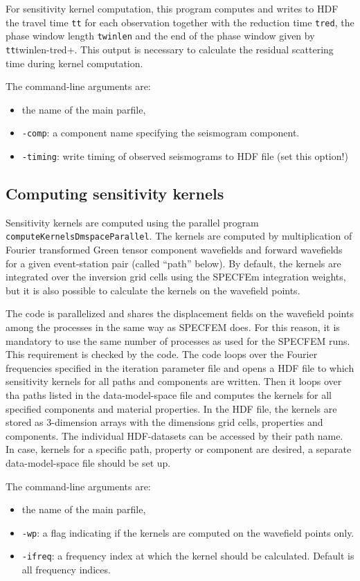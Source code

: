 For sensitivity kernel computation, this program computes and writes to HDF the travel time \verb+tt+ for each observation together with the reduction time \verb+tred+, the phase window length \verb+twinlen+ and the end of the phase window given by \verb+tt+twinlen-tred+. This output is necessary to calculate the residual scattering time during kernel computation.

 The command-line arguments are:
 \begin{itemize}
	\setlength{\itemsep}{-0.1cm}
   \item the name of the main parfile,
   \item \verb+-comp+: a component name specifying the seismogram component.
   \item \verb+-timing+: write timing of observed seismograms to HDF file (set this option!)
 \end{itemize}
%
\subsection{Computing sensitivity kernels}
%
 Sensitivity kernels are computed using the parallel program \verb+computeKernelsDmspaceParallel+. The kernels are computed by multiplication of Fourier transformed Green tensor component wavefields and forward wavefields for a given event-station pair (called “path” below). By default, the kernels are integrated over the inversion grid cells using the SPECFEm integration weights, but it is also possible to calculate the kernels on the wavefield points.

 The code is parallelized and shares the displacement fields on the wavefield points among the processes in the same way as SPECFEM does. For this reason, it is mandatory to use the same number of processes as used for the SPECFEM runs. This requirement is checked by the code. The code loops over the Fourier frequencies specified in the iteration parameter file and opens a HDF file to which sensitivity kernels for all paths and components are written. Then it loops over tha paths listed in the data-model-space file and computes the kernels for all specified components and material properties. In the HDF file, the kernels are stored as 3-dimension arrays with the dimensions grid cells, properties and components. The individual HDF-datasets can be accessed by their path name. In case, kernels for a specific path, property or component are desired, a separate data-model-space file should be set up.

 The command-line arguments are:
 \begin{itemize}
	\setlength{\itemsep}{-0.1cm}
   \item the name of the main parfile,
   \item \verb+-wp+: a flag indicating if the kernels are computed on the wavefield points only.
   \item \verb+-ifreq+: a frequency index at which the kernel should be calculated. Default is all frequency indices.
 \end{itemize}

